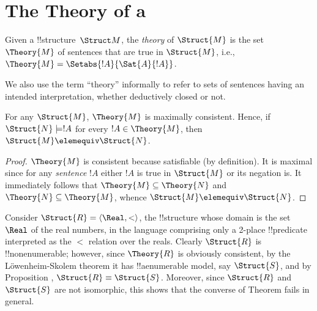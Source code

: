 \documentclass[../../include/open-logic-section]{subfiles}
\begin{document}
\section{The Theory of a }

\begin{defn} 
  Given a !!{structure}~$\Struct M$, the \emph{theory} of
  $\Struct{M}$ is the set $\Theory{M}$ of sentences
  that are true in $\Struct{M}$, i.e., $\Theory{M} =
  \Setabs{!A}{\Sat{A}{!A}}$.
\end{defn}

We also use the term ``theory'' informally to refer to sets
of sentences having an intended interpretation, whether deductively
closed or not.

\begin{prop}
  For any $\Struct{M}$,  $\Theory{M}$ is maximally
  consistent. Hence, if $\Struct{N} \models !A$ for every $!A
  \in \Theory{M}$, then $\Struct{M} \elemequiv
  \Struct{N}$. 
\end{prop}

\begin{proof}
  $\Theory{M}$ is consistent because satisfiable (by definition). It
  is maximal since for any \emph{sentence} $!A$ either $!A$ is true in
  $\Struct{M}$ or its negation is. It immediately follows that
  $\Theory{M} \subseteq \Theory{N}$ and $\Theory{N} \subseteq
  \Theory{M}$, whence $\Struct{M} \elemequiv \Struct{N}$.
\end{proof}

\begin{rem}
  Consider $\Struct{R} = \langle\Real, <\rangle$, the !!{structure}
  whose domain is the set $\Real$ of the real numbers, in the language
  comprising only a 2-place !!{predicate} interpreted as the $<$
  relation over the reals. Clearly $\Struct{R}$ is !!{nonenumerable};
  however, since $\Theory{R}$ is obviously consistent, by the
  L\"owenheim-Skolem theorem it has !!a{enumerable} model, say
  $\Struct{S}$, and by Proposition , $\Struct{R}
  \equiv \Struct{S}$. Moreover, since $\Struct{R}$ and $\Struct{S}$
  are not isomorphic, this shows that the converse of Theorem
   fails in general.
\end{rem}
\end{document}
